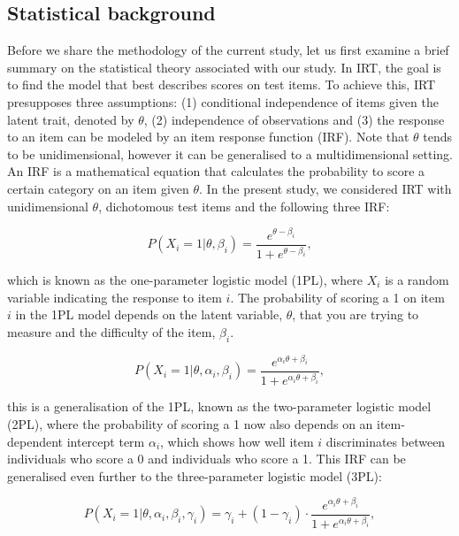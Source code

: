 \documentclass[Royal,sageapa,times,doublespace]{sagej}
\begin{document}
\subsection{Statistical background}
Before we share the methodology of the current study, let us first examine a brief summary on the statistical theory associated with our study. In IRT, the goal is to find the model that best describes scores on test items. To achieve this, IRT presupposes three assumptions: (1) conditional independence of items given the latent trait, denoted by $\theta$, (2) independence of observations and (3) the response to an item can be modeled by an item response function (IRF). Note that $\theta$ tends to be unidimensional, however it can be generalised to a multidimensional setting. An IRF is a mathematical equation that calculates the probability to score a certain category on an item given $\theta$. In the present study, we considered IRT with unidimensional $\theta$, dichotomous test items and the following three IRF:

\begin{equation}
P(X_i = 1 | \theta, \beta_{i}) = \frac{e^{\theta - \beta_{i}}}{1 + e^{\theta - \beta_{i}}},
\end{equation}

which is known as the one-parameter logistic model (1PL), where $X_i$ is a random variable indicating the response to item $i$. The probability of scoring a 1 on item $i$ in the 1PL model depends on the latent variable, $\theta$, that you are trying to measure and the difficulty of the item, $\beta_i$.

\begin{equation}
P(X_i = 1 | \theta, \alpha_{i}, \beta_{i}) = \frac{e^{\alpha_{i}\theta + \beta_{i}}}{1 + e^{\alpha_{i}\theta + \beta_{i}}},
\end{equation}

this is a generalisation of the 1PL, known as the two-parameter logistic model (2PL), where the probability of scoring a 1 now also depends on an item-dependent intercept term $\alpha_i$, which shows how well item $i$ discriminates between individuals who score a 0 and individuals who score a 1. This IRF can be generalised even further to the three-parameter logistic model (3PL):

\begin{equation}
P(X_i = 1 | \theta, \alpha_{i}, \beta_{i}, \gamma_{i}) = \gamma_{i} + (1 - \gamma_{i}) \cdot 
\frac{e^{\alpha_{i}\theta + \beta_{i}}}{1 + e^{\alpha_{i}\theta + \beta_{i}}},
\end{equation}
\end{document}
